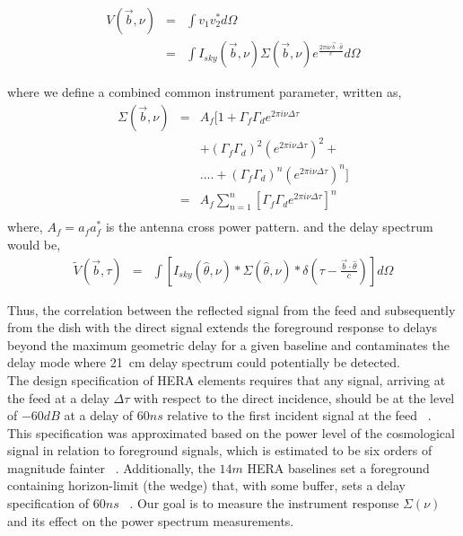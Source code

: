 \documentclass[twocolumn]{emulateapj}
\newcommand{\volt}{{v}}
\newcommand{\vis}{{V}}
\newcommand{\bmvolt}{{a}}
\newcommand{\beam}{{A}}
\newcommand{\thhat}{{\hat\theta}}
\newcommand{\fngexp}{{e^{\frac{2\pi i\nu\vec{b}\cdot\thhat}{c}}}}
\newcommand{\dfngexp}{{e^{2\pi i\nu \Delta \tau}}}
\begin{document}
\begin{eqnarray}\label{eqn:series1}
\vis(\vec b, \nu) & = & \int \volt_{1}\volt_{2}^{*} d\Omega \nonumber\\
			& = & \int I_{sky}(\vec b, \nu)\Sigma(\vec b, \nu) \fngexp d\Omega
\end{eqnarray}

where we define a combined common instrument parameter, written as, 
 \begin{eqnarray}
\Sigma(\vec b, \nu) & = & \beam_{f}  [ 1+  \Gamma_{f}\Gamma_{d} \dfngexp \nonumber\\
&& + (\Gamma_{f}\Gamma_{d})^2(\dfngexp)^{2}+ \nonumber\\
&&  ....+(\Gamma_{f}\Gamma_{d})^{n}(\dfngexp)^{n}  ]\\
& = & \beam_{f}\displaystyle\sum\limits_{n=1}^{n} [\Gamma_{f}\Gamma_{d}\dfngexp]^{n}
   \nonumber\\
   \label{eq6}
\end{eqnarray}
where, $\beam_{f}=\bmvolt_{f}\bmvolt_{f}^{*}$ is the antenna cross power pattern.
and the delay spectrum would be, 
\begin{eqnarray}
\tilde V(\vec b, \tau) & = & \int \left [ I_{sky}(\thhat, \nu) \ast \Sigma(\thhat, \nu) \ast \delta( \tau - \frac{{\vec {b} \cdot \thhat}}{c} )  \right] d\Omega
\label{eq7}
\end{eqnarray}
 
 Thus, the correlation between the reflected signal  from the feed and subsequently from the dish with the direct signal extends the foreground response to delays beyond the maximum geometric delay for a given baseline and contaminates the delay mode where 21~cm delay spectrum could potentially be detected. \\
The design specification of HERA elements requires that any
signal, arriving at the feed at a delay $\Delta \tau$ with respect to the direct incidence, should be
at the level of $-60dB$ at a delay of $60ns$ relative to the first incident
signal at the feed ~\citep{parsons_deboer_memo}. This specification was
approximated based on the power level of the cosmological signal in relation to
foreground signals, which is estimated to be six orders of magnitude fainter
~\citep{santos_et_al2005,ali_et_al2008,deoliveira2008,jelic_et_al2008,bernardi_et_al2009,bernardi_et_al2010,ghosh_et_al2011}. Additionally, the $14m$ HERA baselines set a foreground containing
horizon-limit (the wedge) that, with some buffer, sets a delay specification of
$60ns$
~\citep{parsons_et_al2012b,vedantham_et_al2012,nithya_et_al2013,liu_et_al2014a,liu_et_al2014b}. Our goal is to measure the instrument response $\Sigma(\nu)$ and its effect on the power spectrum measurements. 
\end{document}
